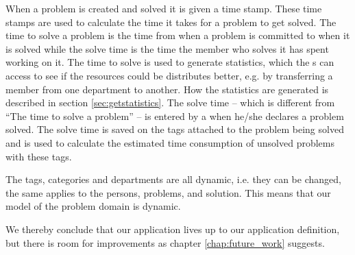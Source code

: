 When a problem is created and solved it is given a time stamp.
These time stamps are used to calculate the time it takes for a problem to get solved.
The time to solve a problem is the time from when a problem is committed to when it is solved while the solve time is the time the \astaff[] member who solves it has spent working on it.
The time to solve is used to generate statistics, which the \admin[]s can access to see if the resources could be distributes better, e.g. by transferring a \astaff[] member from one department to another.
How the statistics are generated is described in section \ref{sec:getstatistics}.
The solve time -- which is different from ``The time to solve a problem'' -- is entered by a \astaff[] when he/she declares a problem solved.
The solve time is saved on the tags attached to the problem being solved and is used to calculate the estimated time consumption of unsolved problems with these tags.

The tags, categories and departments are all dynamic, i.e. they can be changed, the same applies to the persons, problems, and solution.
This means that our model of the problem domain is dynamic.

We thereby conclude that our application lives up to our application definition, but there is room for improvements as chapter \ref{chap:future_work} suggests.



 







